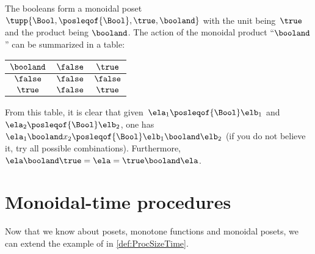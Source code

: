 \begin{example}
    The booleans form a monoidal poset $\tupp{\Bool,\posleqof{\Bool},\true,\booland}$
    with the unit being~$\true$ and the product being $\booland$.
    The action of the monoidal product ``$\booland$'' can be summarized in a table:
    \begin{center}
        \begin{tabular}{c|cc}
            $\booland$ & $\false$ & $\true$ \\
            \hline
            $\false$   & $\false$ & $\false$ \\
            $\true$    & $\false$ & $\true$
        \end{tabular}
    \end{center}
    From this table, it is clear that given~$\ela_1\posleqof{\Bool}\elb_1$ and~$\ela_2\posleqof{\Bool} \elb_2$, one has~$\ela_1\booland x_2\posleqof{\Bool} \elb_1\booland \elb_2$ (if you do not believe it, try all possible combinations).
    Furthermore,~$\ela\booland \true=\ela=\true \booland \ela$.
\end{example}


\section{Monoidal-time procedures}
\label{sec:ProcMod}


Now that we know about posets, monotone functions and monoidal posets, we can extend the example of \ProcSizeTime in \vref{def:ProcSizeTime}.

